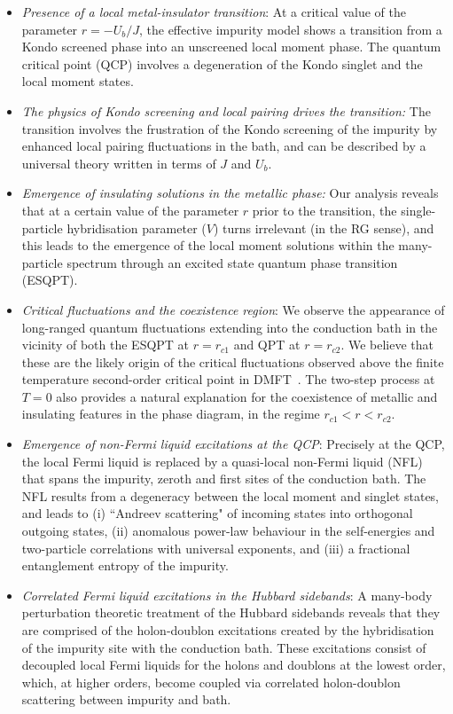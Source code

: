 \documentclass{iopart}
\begin{document}
\begin{itemize}
\item {\it Presence of a local metal-insulator transition}: At a critical value of the parameter $r=-U_{b}/J$, the effective impurity model shows a transition from a Kondo screened phase into an unscreened local moment phase. The quantum critical point (QCP) involves a degeneration of the Kondo singlet and the local moment states.
\item {\it The physics of Kondo screening and local pairing drives the transition:}
The transition involves the frustration of the Kondo screening of the impurity by enhanced local pairing fluctuations in the bath, and can be described by a universal theory written in terms of $J$ and $U_b$.
\item {\it Emergence of insulating solutions in the metallic phase:}
Our analysis reveals that at a certain value of the parameter $r$ prior to the transition, the single-particle hybridisation parameter ($V$) turns irrelevant (in the RG sense), and this leads to the emergence of the local moment solutions within the many-particle spectrum through an excited state quantum phase transition (ESQPT).
\item {\it Critical fluctuations and the coexistence region}: 
We observe the appearance of long-ranged quantum fluctuations extending into the conduction bath in the vicinity of both the ESQPT at $r=r_{c1}$ and QPT at $r=r_{c2}$. We believe that these are the likely origin of the critical fluctuations observed above the finite temperature second-order critical point in DMFT~\cite{terletska_mott_2011,vucicevic_2013}. The two-step process at $T=0$ also provides a natural explanation for the coexistence of metallic and insulating features in the phase diagram, in the regime $r_{c1}<r<r_{c2}$.
\item {\it Emergence of non-Fermi liquid excitations at the QCP}:
Precisely at the QCP, the local  Fermi liquid is replaced by a quasi-local non-Fermi liquid (NFL) that spans the impurity, zeroth and first sites of the conduction bath. The NFL results from a degeneracy between the local moment and singlet states, and leads to (i) ``Andreev scattering" of incoming states into orthogonal outgoing states, (ii) anomalous power-law behaviour in the self-energies and two-particle correlations with universal exponents, and (iii) a fractional entanglement entropy of the impurity.
\item {\it Correlated Fermi liquid excitations in the Hubbard sidebands}:
A many-body perturbation theoretic treatment of the Hubbard sidebands reveals that they are comprised of the holon-doublon excitations created by the hybridisation of the impurity site with the conduction bath. These excitations consist of decoupled local Fermi liquids for the holons and doublons at the lowest order, which, at higher orders, become coupled via correlated holon-doublon scattering between impurity and bath.
\end{itemize}
\end{document}
